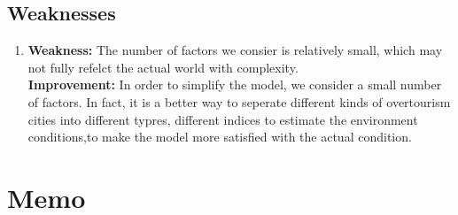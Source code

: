 \documentclass[UTF8]{mcmthesis}
\begin{document}
            
        \subsection{Weaknesses}
            \begin{enumerate}
                \item \textbf{Weakness: }The number of factors we consier is relatively small, which may not fully refelct the actual world with complexity.\\
                \hspace*{2em} \textbf{Improvement:} In order to simplify the model, we consider a small number of factors. In fact, it is a better way to seperate different kinds of overtourism cities into different typres, different indices to estimate the environment conditions,to make the model more satisfied with the actual condition.
            \end{enumerate}

            \section{Memo}
            
\end{document}
